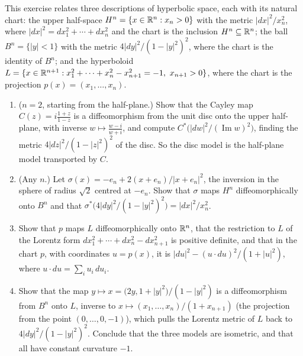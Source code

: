 \begin{exercise}\label{riemannian-geometry:exercise-hyperbolic-models}
This exercise relates three descriptions of hyperbolic space, each with its natural chart: the upper half-space $H^n = \{x \in \mathbb{R}^n : x_n > 0\}$ with the metric
$|dx|^2/x_n^2$, where $|dx|^2 = dx_1^2 + \cdots + dx_n^2$ and the chart is the inclusion $H^n \subseteq \mathbb{R}^n$; the ball $B^n = \{|y| < 1\}$ with the metric $4|dy|^2/(1 - |y|^2)^2$, where the chart
is the identity of $B^n$; and the hyperboloid $L = \{x \in \mathbb{R}^{n+1} : x_1^2 + \cdots + x_n^2 - x_{n+1}^2 = -1,\ x_{n+1} > 0\}$, where the chart is the projection
$p(x) = (x_1, \ldots, x_n)$.
\begin{enumerate}
\item ($n = 2$, starting from the half-plane.) Show that the Cayley map $C(z) = i\frac{1 + z}{1 - z}$ is a diffeomorphism from the unit disc onto the upper half-plane, with inverse
$w \mapsto \frac{w - i}{w + i}$, and compute $C^*\bigl(|dw|^2/(\operatorname{Im}w)^2\bigr)$, finding the metric $4|dz|^2/(1 - |z|^2)^2$ of the disc. So the disc model is the half-plane model
transported by $C$.
\item (Any $n$.) Let $\sigma(x) = -e_n + 2(x + e_n)/|x + e_n|^2$, the inversion in the sphere of radius $\sqrt2$ centred at $-e_n$. Show that $\sigma$ maps $H^n$ diffeomorphically onto $B^n$ and
that $\sigma^*\bigl(4|dy|^2/(1 - |y|^2)^2\bigr) = |dx|^2/x_n^2$.
\item Show that $p$ maps $L$ diffeomorphically onto $\mathbb{R}^n$, that the restriction to $L$ of the Lorentz form $dx_1^2 + \cdots + dx_n^2 - dx_{n+1}^2$ is positive definite, and that in the chart $p$, with
coordinates $u = p(x)$, it is $|du|^2 - (u \cdot du)^2/(1 + |u|^2)$, where $u \cdot du = \sum_iu_i\,du_i$.
\item Show that the map $y \mapsto x = \bigl(2y, 1 + |y|^2\bigr)/(1 - |y|^2)$ is a diffeomorphism from $B^n$ onto $L$, inverse to $x \mapsto (x_1, \ldots, x_n)/(1 + x_{n+1})$ (the projection from
the point $(0, \ldots, 0, -1)$), which pulls the Lorentz metric of $L$ back to $4|dy|^2/(1 - |y|^2)^2$. Conclude that the three models are isometric, and that all have constant curvature $-1$.
\end{enumerate}
\end{exercise}

